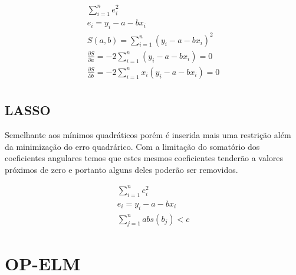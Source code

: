 \documentclass{beamer}
\begin{document}
\begin{frame}
	\begin{align}
	\sum_{i=1}^n e_i^2
	\\
	e_i = y_i - a - b x_i
	\\
	S(a,b) = \sum_{i=1}^n \left( y_i - a - b x_i \right) ^2
	\\
	\frac{\partial S}{\partial a}  = -2 \sum_{i=1}^n ( y_i - a - b x_i ) = 0 
	\\
	\frac{\partial S}{\partial b}  = -2 \sum_{i=1}^n x_i  ( y_i - a - b x_i  ) = 0 \\
	\end{align}
	
	\begin{figure}
	  \centering
	  \qquad
	\end{figure}
\end{frame} 


\subsection{LASSO}

\begin{frame}
Semelhante aos mínimos quadráticos porém é inserida mais uma restrição além da
minimização do erro quadrárico.
Com a limitação do somatório dos coeficientes angulares temos que estes mesmos
coeficientes tenderão a valores próximos de zero e portanto alguns deles poderão
ser removidos.

\begin{align}
	\sum_{i=1}^n e_i^2
	\\
	e_i = y_i - a - b x_i
	\\
	\sum_{j=1}^n abs(b_j) < c
\end{align}




\end{frame}





\section{OP-ELM}
\end{document}
